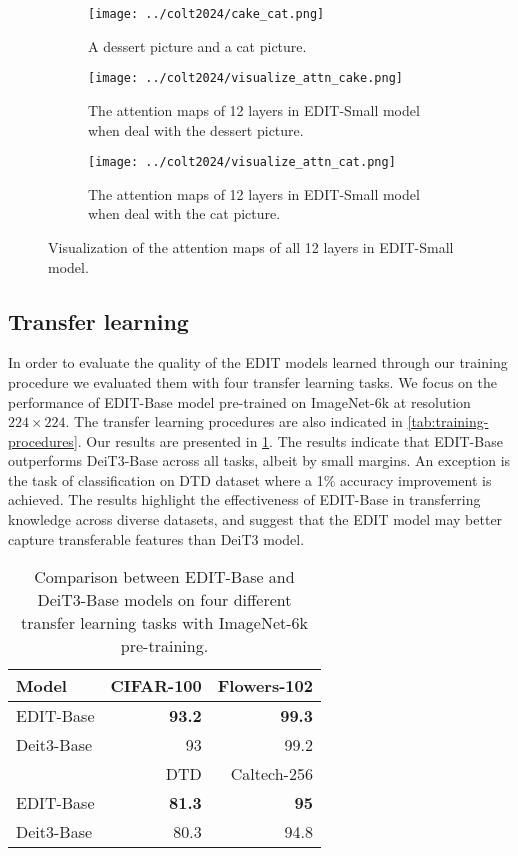 \begin{figure}
  \centering
  \begin{subfigure}{0.99\linewidth}
    \texttt{[image: ../colt2024/cake\_cat.png]}
    \caption{A dessert picture and a cat picture.}\label{fig:cake-cat}
  \end{subfigure}
  \vfill
  \begin{subfigure}{0.99\linewidth}
    \texttt{[image: ../colt2024/visualize\_attn\_cake.png]}
    \caption{The attention maps of 12 layers in EDIT-Small model when deal with the dessert picture.}\label{fig:visualize-attn-cake}
  \end{subfigure}
  \vfill
  \begin{subfigure}{0.99\linewidth}
    \texttt{[image: ../colt2024/visualize\_attn\_cat.png]}
    \caption{The attention maps of 12 layers in EDIT-Small model when deal with the cat picture.}\label{fig:visualize-attn-cat}
\end{subfigure}
  \caption{Visualization of the attention maps of all 12 layers in EDIT-Small model.}
  \label{fig:visualize}
\end{figure}


\subsection{Transfer learning}
In order to evaluate the quality of the EDIT models learned through our training procedure we evaluated them with four transfer learning tasks.
We focus on the performance of EDIT-Base model pre-trained on ImageNet-6k at resolution $224 \times 224$. 
The transfer learning procedures are also indicated in \cref{tab:training-procedures}.
Our results are presented in \cref{tab:transfer-learning}.
The results indicate that EDIT-Base outperforms DeiT3-Base across all tasks, albeit by small margins.
An exception is the task of classification on DTD dataset where a 1\% accuracy improvement is achieved.
The results highlight the effectiveness of EDIT-Base in transferring knowledge across diverse datasets, and suggest that the EDIT model may better capture transferable features than DeiT3 model.

\begin{table} [h!]
  \centering
  \begin{tabular}{l|rr}
    \toprule
    Model & CIFAR-100 & Flowers-102  \\
    \midrule
    EDIT-Base & \textbf{93.2} & \textbf{99.3} \\
    Deit3-Base & 93 & 99.2 \\
    \midrule
    & DTD  & Caltech-256  \\
    \midrule
    EDIT-Base & \textbf{81.3} & \textbf{95} \\
    Deit3-Base & 80.3 & 94.8 \\
    \bottomrule
  \end{tabular}
  \caption{Comparison between EDIT-Base and DeiT3-Base models on four different transfer learning tasks with ImageNet-6k pre-training.}
  \label{tab:transfer-learning}
\end{table}

